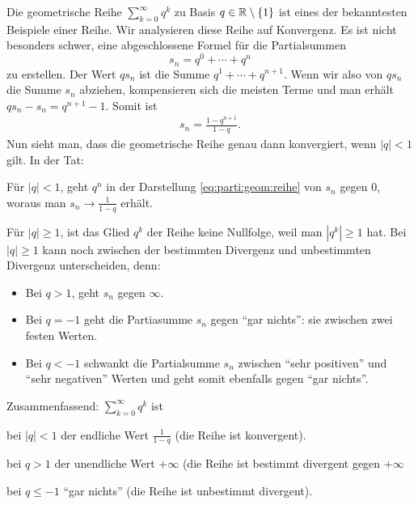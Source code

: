 \begin{bsp} 
	Die geometrische Reihe $\sum_{k=0}^\infty q^k$ zu Basis $q \in \mathbb{R} \setminus \{1\}$ ist eines der bekanntesten Beispiele einer Reihe. Wir analysieren diese Reihe auf Konvergenz. Es ist nicht besonders schwer, eine abgeschlossene Formel für die Partialsummen 
	\[
		s_n = q^0 + \cdots + q^n
	\]
	zu erstellen. Der Wert $q s_n$ ist die Summe $q^1 + \cdots + q^{n+1}$. Wenn wir also von $q s_n$ die Summe $s_n$ abziehen, kompensieren sich die meisten Terme und man erhält $q s_n - s_n = q^{n+1} -1$. Somit ist 
	\begin{align}
		\label{eq:parti:geom:reihe}
		s_n = \frac{1 - q^{n+1}}{1-q}. 
	\end{align}
	Nun sieht man, dass die geometrische Reihe genau dann konvergiert, wenn $|q| < 1$ gilt. In der Tat: 
	\begin{enuma}
		\item Für $|q| < 1$, geht $q^n$ in der Darstellung \eqref{eq:parti:geom:reihe} von $s_n$ gegen $0$, woraus man $s_n \to \frac{1}{1-q}$ erhält. 
		\item Für $|q| \ge 1$, ist das Glied $q^k$ der Reihe keine Nullfolge, weil man $|q^k| \ge 1$ hat. 	Bei $|q| \ge 1$ kann noch zwischen der bestimmten Divergenz und unbestimmten Divergenz unterscheiden, denn: 
		\begin{itemize} 
			\item Bei $q>1$, geht $s_n$ gegen $\infty$. 
			\item Bei $q = -1$ geht die Partiasumme $s_n$ gegen ``gar nichts'':  sie zwischen zwei festen Werten. 
			\item Bei $q< -1$ schwankt die Partialsumme $s_n$ zwischen ``sehr positiven'' und ``sehr negativen'' Werten und geht somit ebenfalls gegen ``gar nichts''. 
		\end{itemize} 
	\end{enuma}
	
	Zusammenfassend: 	\(
	\sum_{k=0}^\infty q^k 
	\) ist
	\begin{enuma}
		\item bei $|q|<1$ der endliche Wert $\frac{1}{1-q}$ (die Reihe ist konvergent). 
		\item bei $q>1$ der unendliche Wert $+\infty$ (die Reihe ist bestimmt divergent gegen $+\infty$
		\item bei $q \le -1$ ``gar nichts'' (die Reihe ist unbestimmt divergent). 
	\end{enuma} 
\end{bsp} 

